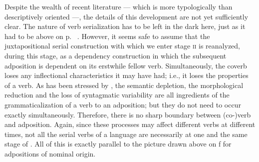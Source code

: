 Despite the wealth of recent literature — which is more typologically than descriptively oriented —, the details of this development are not yet sufficiently clear. The nature of verb serialization has to be left in the dark here, just as it had to be above on p.~\pageref{page37}\chk%
. However, it seems safe to assume that the juxtapositional serial construction with which we enter stage \textsc{ii} is reanalyzed, during this stage, as a dependency construction in which the subsequent adposition is dependent on its erstwhile fellow verb. Simultaneously, the coverb loses any inflectional characteristics it may have had; i.e., it loses the properties of a verb. As has been stressed by \citet[82--86]{Givón1975}, the semantic depletion, the morphological reduction and the loss of syntagmatic variability are all ingredients of the grammaticalization of a verb to an adposition; but they do not need to occur exactly simultaneously. Therefore, there is no sharp boundary between (co-)verb and adposition. Again, since these processes may affect different verbs at different times, not all the serial verbs of a language are necessarily at one and the same stage of . All of this is exactly parallel to the picture drawn above on \pageref{page102}\chk%
f  for adpositions of nominal origin.

